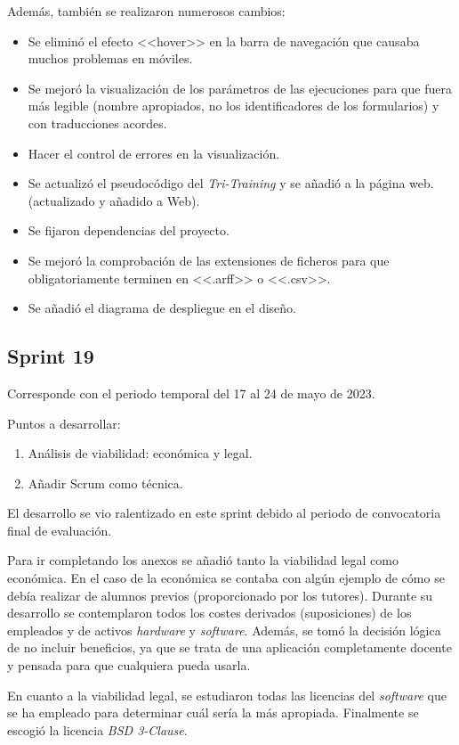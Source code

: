 Además, también se realizaron numerosos cambios:
\begin{itemize}
    \item Se eliminó el efecto <<hover>> en la barra de navegación que causaba
    muchos problemas en móviles.
    \item Se mejoró la visualización de los parámetros de las ejecuciones para
    que fuera más legible (nombre apropiados, no los identificadores de los
    formularios) y con traducciones acordes.
    \item Hacer el control de errores en la visualización.
    \item Se actualizó el pseudocódigo del \emph{Tri-Training} y se añadió a la
    página web. (actualizado y añadido a Web).
    \item Se fijaron dependencias del proyecto.
    \item Se mejoró la comprobación de las extensiones de ficheros para que
    obligatoriamente terminen en <<.arff>> o <<.csv>>.
    \item Se añadió el diagrama de despliegue en el diseño.
\end{itemize}

\subsection{Sprint 19}
Corresponde con el periodo temporal del 17 al 24 de mayo de 2023.

Puntos a desarrollar:
\begin{enumerate}
    \item Análisis de viabilidad: económica y legal.
    \item Añadir Scrum como técnica.
\end{enumerate}

El desarrollo se vio ralentizado en este sprint debido al periodo de
convocatoria final de evaluación.

Para ir completando los anexos se añadió tanto la viabilidad legal como
económica. En el caso de la económica se contaba con algún ejemplo de cómo se
debía realizar de alumnos previos (proporcionado por los tutores). Durante su
desarrollo se contemplaron todos los costes derivados (suposiciones) de los
empleados y de activos \textit{hardware} y \textit{software}. Además, se tomó la
decisión lógica de no incluir beneficios, ya que se trata de una aplicación
completamente docente y pensada para que cualquiera pueda usarla.

En cuanto a la viabilidad legal, se estudiaron todas las licencias del
\textit{software} que se ha empleado para determinar cuál sería la más
apropiada. Finalmente se escogió la licencia \textit{BSD 3-Clause}.

